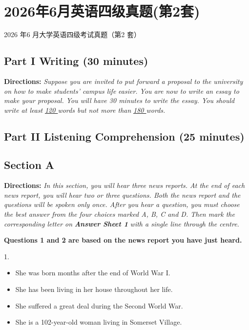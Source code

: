 \documentclass[UTF8,11pt]{ctexart}
\begin{document}
\section*{2026年6月英语四级真题(第2套)}
2026 年6 月大学英语四级考试真题（第2 套）


\subsection*{\textbf{Part I Writing} \textbf{(30 minutes)}}


\textbf{Directions:} \textit{Suppose you are invited to put forward a proposal to the university on how to make students’ campus life} \textit{easier. You are now to write an essay to make your proposal. You will have 30 minutes to write the essay. You should} \textit{write at least }\textit{\uline{120 }}\textit{words but not more than }\textit{\uline{180 }}\textit{words.}


\subsection*{\textbf{Part II} \textbf{Listening Comprehension} \textbf{(25 minutes)}}


\subsection*{\textbf{Section A}}


\textbf{Directions:} \textit{In this section, you will hear three news reports. At the end of each news report, you will hear two or three} \textit{questions. Both the news report and the questions will be spoken only once. After you hear a question, you must choose} \textit{the best answer from the four choices marked A, B, C and D. Then mark the corresponding letter on }\textbf{\textit{Answer Sheet 1}} \textit{with a single line through the centre.}


\textbf{Questions 1 and 2 are based on the news report you have just heard.}


1.


\begin{itemize}[leftmargin=2em,itemsep=.2em,topsep=.4em]\item[A.] She was born months after the end of World War I.
\item[B.] She has been living in her house throughout her life.
\item[C.] She suffered a great deal during the Second World War.
\item[D.] She is a 102-year-old woman living in Somerset Village.
\end{itemize}
\end{document}
